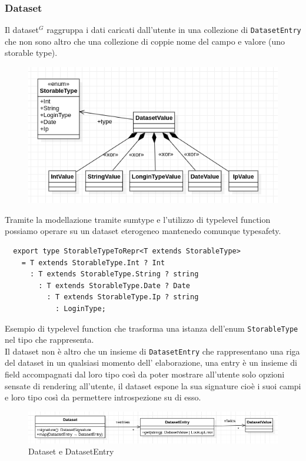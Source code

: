 \subsubsection{Dataset}
Il dataset$^{G}$ raggruppa i dati caricati dall'utente in una collezione di
\texttt{DatasetEntry} che non sono altro che una collezione di coppie nome del
campo e valore (uno storable type). \\
\begin{figure}[H]
  \centering
  \includegraphics[scale=0.65]{../../assets/classi_uml/datasetentrypng.png}
\end{figure}
Tramite la modellazione tramite sumtype e l'utilizzo di typelevel function
possiamo operare su un dataset eterogeneo mantenedo comunque typesafety.
\begin{verbatim}
  export type StorableTypeToRepr<T extends StorableType>
    = T extends StorableType.Int ? Int
      : T extends StorableType.String ? string
        : T extends StorableType.Date ? Date
          : T extends StorableType.Ip ? string
            : LoginType;
\end{verbatim}
Esempio di typelevel function che trasforma una istanza dell'enum
\texttt{StorableType} nel tipo che rappresenta.
\\

\noindent
Il dataset non è altro che un insieme di \texttt{DatasetEntry} che rappresentano
una riga del dataset in un qualsiasi momento dell' elaborazione, una entry è un
insieme di field accompagnati dal loro tipo così da poter mostrare all'utente
solo opzioni sensate di rendering all'utente, il dataset espone la sua signature
cioè i suoi campi e loro tipo così da permettere introspezione su di esso.\\

\begin{figure}[h!]
  \centering
  \includegraphics[scale=0.55]{../../assets/classi_uml/dataset.png}
  \caption{Dataset e DatasetEntry}
\end{figure}

